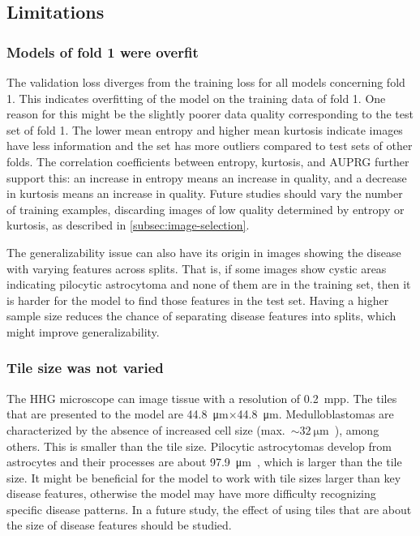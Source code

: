 \subsection{Limitations}
\subsubsection{Models of fold 1 were overfit}
The validation loss diverges from the training loss for all models concerning fold 1.
This indicates overfitting of the model on the training data of fold 1.
One reason for this might be the slightly poorer data quality corresponding to the test set of fold 1.
The lower mean entropy and higher mean kurtosis indicate images have less information and the set has more outliers compared to test sets of other folds.
The correlation coefficients between entropy, kurtosis, and AUPRG further support this: an increase in entropy means an increase in quality, and a decrease in kurtosis means an increase in quality.
Future studies should vary the number of training examples, discarding images of low quality determined by entropy or kurtosis, as described in \ref{subsec:image-selection}.

The generalizability issue can also have its origin in images showing the disease with varying features across splits.
That is, if some images show \eg cystic areas indicating pilocytic astrocytoma and none of them are in the training set, then it is harder for the model to find those features in the test set.
Having a higher sample size reduces the chance of separating disease features into splits, which might improve generalizability.

\subsubsection{Tile size was not varied}
The HHG microscope can image tissue with a resolution of \qty{0.2}{mpp}.
The tiles that are presented to the model are \qty{44.8}{\micro\meter}$\times$\qty{44.8}{\micro\meter}.
Medulloblastomas are characterized by the absence of increased cell size (max.~$\sim\qty{32}{\micro\meter}$~\cite{Orr2020}), among others.
This is smaller than the tile size.
Pilocytic astrocytomas develop from astrocytes and their processes are about \qty{97.9}{\micro\meter}~\cite{Vasile2017}, which is larger than the tile size.
It might be beneficial for the model to work with tile sizes larger than key disease features, otherwise the model may have more difficulty recognizing specific disease patterns.
In a future study, the effect of using tiles that are about the size of disease features should be studied.


